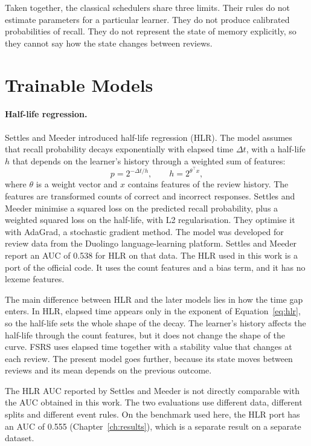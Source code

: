 Taken together, the classical schedulers share three limits. Their rules do not estimate parameters
for a particular learner. They do not produce calibrated probabilities of recall. They do not
represent the state of memory explicitly, so they cannot say how the state changes between reviews.

\section{Trainable Models}
\label{sec:lit-trainable}

\paragraph{Half-life regression.}
Settles and Meeder \cite{settles2016trainable} introduced half-life regression (HLR). The model
assumes that recall probability decays exponentially with elapsed time $\Delta t$, with a half-life
$h$ that depends on the learner's history through a weighted sum of features:
\begin{equation}
  p = 2^{-\Delta t/h}, \qquad h = 2^{\theta^\top x},
  \label{eq:hlr}
\end{equation}
where $\theta$ is a weight vector and $x$ contains features of the review history. The features are
transformed counts of correct and incorrect responses. Settles and Meeder minimise a squared loss on the predicted recall
probability, plus a weighted squared loss on the half-life, with L2 regularisation. They optimise it with
AdaGrad, a stochastic gradient method. The model was developed for review data from the Duolingo
language-learning platform.
Settles and Meeder report an AUC of 0.538 for HLR on that data. The HLR used in this work is a port of
the official code. It uses the count features and a bias term, and it has no lexeme features.

The main difference between HLR and the later models lies in how the time gap enters. In HLR, elapsed time
appears only in the exponent of Equation~\eqref{eq:hlr}, so the half-life sets the whole shape of the decay.
The learner's history affects the half-life through the count features, but it does not change the shape of
the curve. FSRS uses elapsed time together with a stability value that changes at each review. The present
model goes further, because its state moves between reviews and its mean depends on the previous outcome.

The HLR AUC reported by Settles and Meeder is not directly comparable with the AUC obtained in this work.
The two evaluations use different data, different splits and different event rules. On the benchmark used
here, the HLR port has an AUC of 0.555 (Chapter~\ref{ch:results}), which is a separate result on a separate
dataset.


